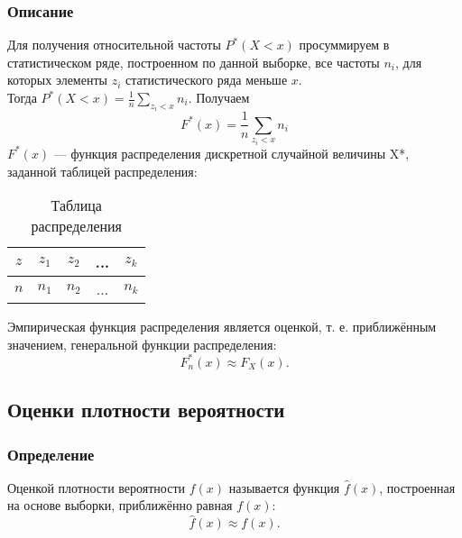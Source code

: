 \documentclass[12pt,a4paper]{article}
\begin{document}
	\subsubsection{Описание}
		Для получения относительной частоты $P^*(X < x)$ просуммируем в статистическом ряде, построенном по данной выборке, все частоты $n_i$, для которых элементы $z_i$ статистического ряда меньше $x$.\\ Тогда $P^*(X<x) = \frac{1}{n}\sum_{z_i < x}n_i$. Получаем
		\begin{equation}\label{eqn:edf_sum}
			F^*(x) = \frac{1}{n}\sum_{z_i < x}n_i
		\end{equation}
		$F^*(x)$ ---  функция распределения дискретной случайной величины X*, заданной таблицей распределения:
		\begin{center}
			\begin{table}[h]
				\begin{center}
					\begin{tabular}{|c|c|c|c|c|}
						\hline
						$z$ & $z_1$ & $z_2$ & ... & $z_k$\\
						\hline
						$n$ & $n_1$ & $n_2$ & ... & $n_k$\\
						\hline
					\end{tabular}
				\end{center}
				\caption{Таблица распределения}
			\end{table}
		\end{center}
		Эмпирическая функция распределения является оценкой, т. е. приближённым значением, генеральной функции распределения:
		\begin{equation}\label{eqn:edf_approx}
		F^*_n(x) \approx F_X(x).
		\end{equation}
	
	\subsection{Оценки плотности вероятности}
	\subsubsection{Определение}
		Оценкой плотности вероятности $f(x)$ называется функция $\hat{f}(x)$, построенная на основе выборки, приближённо равная $f(x)$:
		\begin{equation}\label{eqn:pdf_approx}
			\hat{f}(x) \approx f(x).
		\end{equation}
\end{document}
